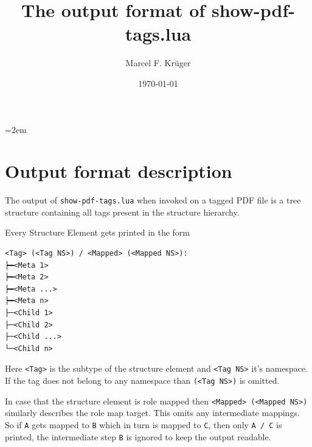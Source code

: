 \documentclass[a4paper]{article}
\title{The output format of show-pdf-tags.lua}
\author{Marcel F. Krüger}
\date{\today}
\begin{document}
\emergencystretch=2em
\maketitle
\section{Output format description}
The output of \texttt{show-pdf-tags.lua} when invoked on a tagged PDF file is a tree structure containing all tags present in the structure hierarchy.

Every Structure Element gets printed in the form
\begin{verbatim}
<Tag> (<Tag NS>) / <Mapped> (<Mapped NS>):
┝━<Meta 1>
┝━<Meta 2>
┝━<Meta ...>
┝━<Meta n>
├─<Child 1>
├─<Child 2>
├─<Child ...>
└─<Child n>
\end{verbatim}
Here \texttt{<Tag>} is the subtype of the structure element and \texttt{<Tag NS>} it's namespace.
If the tag does not belong to any namespace than \texttt{(<Tag NS>)} is omitted. 

In case that the structure element is role mapped then \texttt{<Mapped> (<Mapped NS>)} similarly describes the role map target.
This omits any intermediate mappings. So if \texttt{A} gets mapped to \texttt{B} which in turn is mapped to \texttt{C}, then
only \texttt{A / C} is printed, the intermediate step \texttt{B} is ignored to keep the output readable.
\end{document}
